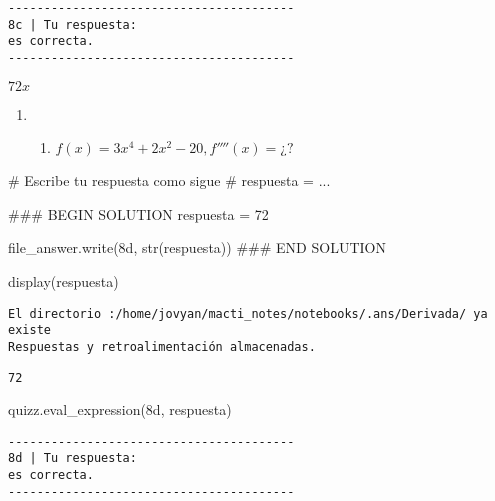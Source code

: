 \documentclass[
  letterpaper,
  DIV=11,
  numbers=noendperiod]{scrreprt}
\newenvironment{Shaded}{\begin{snugshade}}{\end{snugshade}}
\newcommand{\BuiltInTok}[1]{\textcolor[rgb]{0.00,0.23,0.31}{#1}}
\newcommand{\CommentTok}[1]{\textcolor[rgb]{0.37,0.37,0.37}{#1}}
\newcommand{\DecValTok}[1]{\textcolor[rgb]{0.68,0.00,0.00}{#1}}
\newcommand{\NormalTok}[1]{\textcolor[rgb]{0.00,0.23,0.31}{#1}}
\newcommand{\OperatorTok}[1]{\textcolor[rgb]{0.37,0.37,0.37}{#1}}
\newcommand{\RegionMarkerTok}[1]{\textcolor[rgb]{0.00,0.23,0.31}{#1}}
\newcommand{\StringTok}[1]{\textcolor[rgb]{0.13,0.47,0.30}{#1}}
\providecommand{\tightlist}{%
  \setlength{\itemsep}{0pt}\setlength{\parskip}{0pt}}\usepackage{longtable,booktabs,array}
\begin{document}
\begin{verbatim}
----------------------------------------
8c | Tu respuesta:
es correcta.
----------------------------------------
\end{verbatim}

$\displaystyle 72 x$

\begin{enumerate}
\def\labelenumi{\arabic{enumi}.}
\setcounter{enumi}{7}
\tightlist
\item
  \begin{enumerate}
  \def\labelenumii{\alph{enumii}.}
  \setcounter{enumii}{3}
  \tightlist
  \item
    \(f(x) = 3x^4 + 2x^2 - 20, f''''(x) = ¿?\)
  \end{enumerate}
\end{enumerate}

\begin{Shaded}
\begin{Highlighting}[]
\CommentTok{\# Escribe tu respuesta como sigue }
\CommentTok{\# respuesta = ...}

\CommentTok{\#\#\# }\RegionMarkerTok{BEGIN}\CommentTok{ SOLUTION}
\NormalTok{respuesta }\OperatorTok{=} \DecValTok{72}

\NormalTok{file\_answer.write(}\StringTok{\textquotesingle{}8d\textquotesingle{}}\NormalTok{, }\BuiltInTok{str}\NormalTok{(respuesta))}
\CommentTok{\#\#\# }\RegionMarkerTok{END}\CommentTok{ SOLUTION}

\NormalTok{display(respuesta)}
\end{Highlighting}
\end{Shaded}

\begin{verbatim}
El directorio :/home/jovyan/macti_notes/notebooks/.ans/Derivada/ ya existe
Respuestas y retroalimentación almacenadas.
\end{verbatim}

\begin{verbatim}
72
\end{verbatim}

\begin{Shaded}
\begin{Highlighting}[]
\NormalTok{quizz.eval\_expression(}\StringTok{\textquotesingle{}8d\textquotesingle{}}\NormalTok{, respuesta)}
\end{Highlighting}
\end{Shaded}

\begin{verbatim}
----------------------------------------
8d | Tu respuesta:
es correcta.
----------------------------------------
\end{verbatim}
\end{document}

